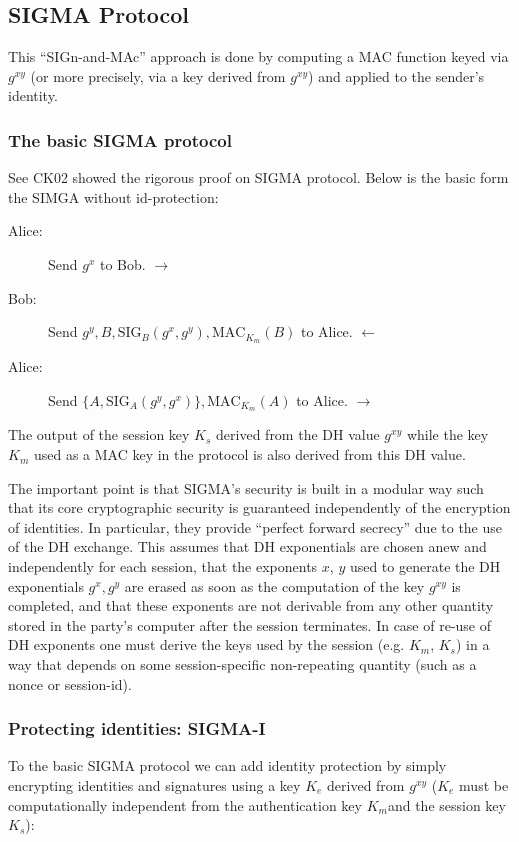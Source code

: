 \documentclass[11pt]{article}
\newcommand{\sig}{\text{SIG}}
\newcommand{\mac}{\text{MAC}}
\begin{document}
\subsection{SIGMA Protocol}
This ``SIGn-and-MAc'' approach is done by computing a MAC function keyed via $g^{xy}$ (or more precisely, via a key derived from $g^{xy}$) and applied to the sender's identity.

\subsubsection{The basic SIGMA protocol}
See CK02 \cite{CanettiK02} showed the rigorous proof on SIGMA protocol. Below is the basic form the SIMGA without id-protection:
\begin{description}
\item[Alice:] Send $g^x$ to Bob. $\longrightarrow$
\item[Bob:] Send $g^y, B, \sig_B(g^x, g^y), \mac_{K_m}(B)$ to Alice.  $\longleftarrow$
\item[Alice:] Send $\{A, \sig_A(g^y, g^x)\}, \mac_{K_m}(A)$ to Alice. $\longrightarrow$
\end{description}
The output of the session key $K_s$ derived from the DH value $g^{xy}$ while the key $K_m$ used as a MAC key in the protocol is also derived from this DH value.

The important point is that SIGMA's security is built in a modular way such that its core cryptographic security is guaranteed independently of the encryption of identities.
In particular, they provide ``perfect forward secrecy” due to the use of the DH exchange. This assumes that DH exponentials are chosen anew and independently for each session, that the exponents $x$, $y$ used to generate the DH exponentials $g^x, g^y$ are erased as soon as the computation of the key $g^{xy}$ is completed, and that these exponents are not derivable from any other quantity stored in the party’s computer after the session terminates. In case of re-use of DH exponents one must derive the keys used by the session (e.g. $K_m$, $K_s$) in a way that depends on some session-specific non-repeating quantity (such as a nonce or session-id).

\subsubsection{Protecting identities: SIGMA-I}
To the basic SIGMA protocol we can add identity protection by simply encrypting identities and signatures using a key $K_e$ derived from $g^{xy}$ ($K_e$ must be computationally independent from the authentication key $K_m $and the session key $K_s$):
\end{document}
